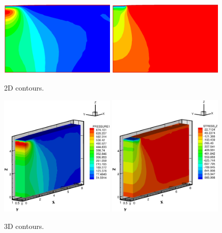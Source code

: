 \begin{figure}[!tbh]
\begin{center}
\includegraphics[width=0.49\textwidth]{chapter_14/figures/fig_14_1_6_a}
\includegraphics[width=0.49\textwidth]{chapter_14/figures/fig_14_1_6_b}
\end{center}
\vspace{-0.5cm}
\caption{2D contours.}
\label{fig:e10}

\begin{center}
\includegraphics[width=0.49\textwidth]{chapter_14/figures/fig_14_1_7_a}
\includegraphics[width=0.49\textwidth]{chapter_14/figures/fig_14_1_7_b}
\end{center}
\vspace{-0.5cm}
\caption{3D contours.}
\label{fig:e12}
\end{figure}